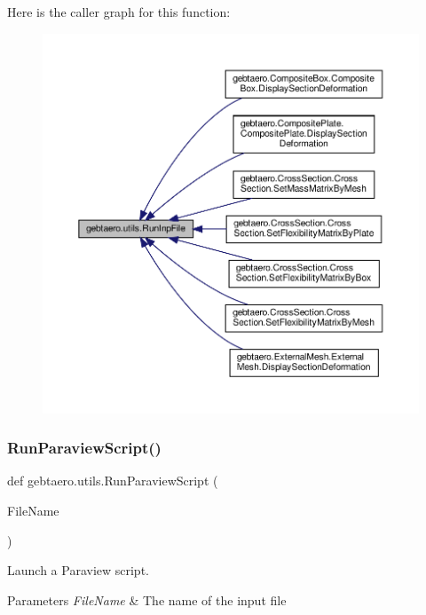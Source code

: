 Here is the caller graph for this function\+:
\nopagebreak
\begin{figure}[H]
\begin{center}
\leavevmode
\includegraphics[width=350pt]{namespacegebtaero_1_1utils_a74be96ae0691643c4e6c459e14360464_icgraph}
\end{center}
\end{figure}
\mbox{\label{namespacegebtaero_1_1utils_a248e0abbec4c02bcb7e75fea0f400c25}} 
\subsubsection{\texorpdfstring{Run\+Paraview\+Script()}{RunParaviewScript()}}
{\footnotesize\ttfamily def gebtaero.\+utils.\+Run\+Paraview\+Script (\begin{DoxyParamCaption}\item[{}]{File\+Name }\end{DoxyParamCaption})}



Launch a Paraview script. 


\begin{DoxyParams}{Parameters}
{\em File\+Name} & The name of the input file \\
\hline
\end{DoxyParams}


